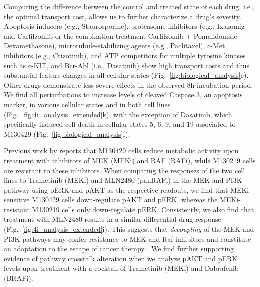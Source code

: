  Computing the difference between the control and treated state of each drug, i.e., the optimal
transport cost, allows us to further characterize a drug's severity. 
Apoptosis inducers (e.g., Staurosporine), proteasome inhibitors (e.g., Ixazomig and Carfilzomib or the combination treatment Carfilzomib + Pomalidomide + Dexamethasone), microtubule-stabilizing agents (e.g., Paclitaxel), c-Met inhibitors (e.g., Crizotinib), and ATP competitors for multiple tyrosine kinases such as c-KIT, and Bcr-Abl (i.e., Dasatinib) show high transport costs and thus substantial feature changes in all cellular states (Fig.~\ref{fig:biological_analysis}e). Other drugs demonstrate less severe effects in the observed 8h incubation period. 
We find all perturbations to increase levels of cleaved Caspase 3, an apoptosis marker, in various cellular states and in both cell lines (Fig.~\ref{fig:4i_analysis_extended}k), with the exception of Dasatinib, which specifically induced cell death in cellular states 5, 6, 9, and 19 associated to M130429 (Fig.~\ref{fig:biological_analysis}f).


 Previous work by \citet{smith2016inhibiting} reports that M130429 cells reduce metabolic activity %
upon treatment with inhibitors of MEK (MEKi) and RAF (RAFi), while M130219 cells are resistant to these inhibitors. When comparing the responses of the two cell lines to Trametinib (MEKi) and MLN2480 (panRAFi) in the MEK and PI3K pathway using pERK and pAKT as the respective readouts, we find that MEKi-sensitive M130429 cells down-regulate pAKT and pERK, whereas the MEKi-resistant M130219 cells only down-regulate pERK. Consistently, we also find that treatment with MLN2480 results in a similar differential drug response (Fig.~\ref{fig:4i_analysis_extended}i). This suggests that \textit{decoupling} of the MEK and PI3K pathways may confer resistance to MEK and Raf inhibitors and constitute an adaptation to the escape of cancer therapy \citep{kun2021mek}. We find further supporting evidence of pathway crosstalk alteration when we analyze pAKT and pERK levels upon treatment with a cocktail of Trametinib (MEKi) and Dabrafenib (BRAFi). 

